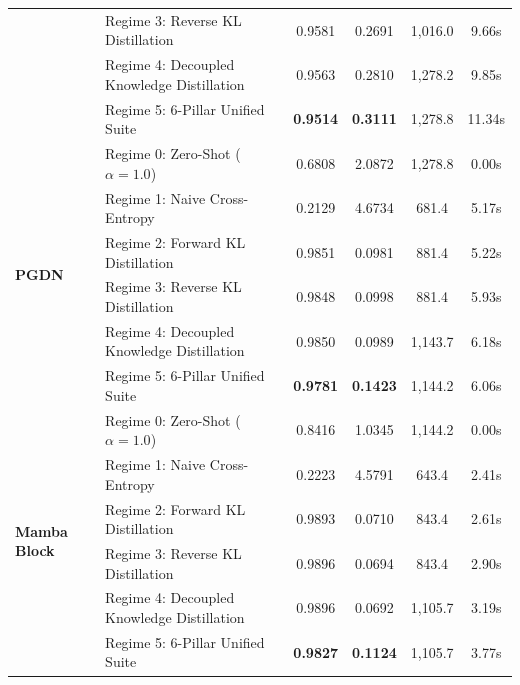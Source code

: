 \begin{table}[t]
\begin{tabular}{llcccc}
 & Regime 3: Reverse KL Distillation & 0.9581 & 0.2691 & 1,016.0 & 9.66s \\
 & Regime 4: Decoupled Knowledge Distillation & 0.9563 & 0.2810 & 1,278.2 & 9.85s \\
 & Regime 5: 6-Pillar Unified Suite & \textbf{0.9514} & \textbf{0.3111} & 1,278.8 & 11.34s \\
\midrule
\multirow{6}{*}{\textbf{PGDN}} & Regime 0: Zero-Shot ($\alpha=1.0$) & 0.6808 & 2.0872 & 1,278.8 & 0.00s \\
 & Regime 1: Naive Cross-Entropy & 0.2129 & 4.6734 & 681.4 & 5.17s \\
 & Regime 2: Forward KL Distillation & 0.9851 & 0.0981 & 881.4 & 5.22s \\
 & Regime 3: Reverse KL Distillation & 0.9848 & 0.0998 & 881.4 & 5.93s \\
 & Regime 4: Decoupled Knowledge Distillation & 0.9850 & 0.0989 & 1,143.7 & 6.18s \\
 & Regime 5: 6-Pillar Unified Suite & \textbf{0.9781} & \textbf{0.1423} & 1,144.2 & 6.06s \\
\midrule
\multirow{6}{*}{\textbf{Mamba Block}} & Regime 0: Zero-Shot ($\alpha=1.0$) & 0.8416 & 1.0345 & 1,144.2 & 0.00s \\
 & Regime 1: Naive Cross-Entropy & 0.2223 & 4.5791 & 643.4 & 2.41s \\
 & Regime 2: Forward KL Distillation & 0.9893 & 0.0710 & 843.4 & 2.61s \\
 & Regime 3: Reverse KL Distillation & 0.9896 & 0.0694 & 843.4 & 2.90s \\
 & Regime 4: Decoupled Knowledge Distillation & 0.9896 & 0.0692 & 1,105.7 & 3.19s \\
 & Regime 5: 6-Pillar Unified Suite & \textbf{0.9827} & \textbf{0.1124} & 1,105.7 & 3.77s \\
\bottomrule
\end{tabular}
\end{table}
